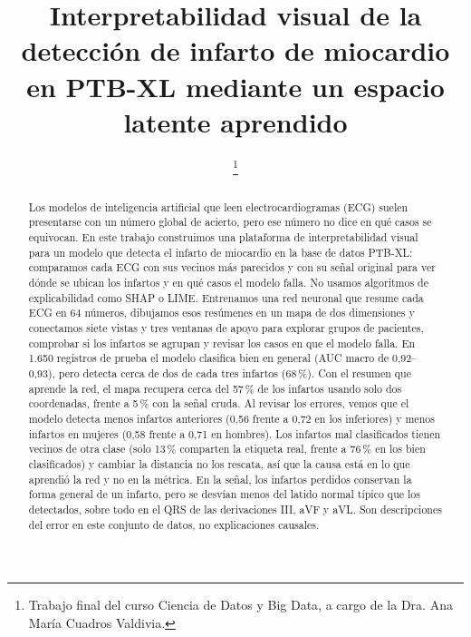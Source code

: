 \documentclass[conference]{IEEEtran}
\begin{document}
\title{Interpretabilidad visual de la detección de infarto de miocardio en PTB-XL mediante un espacio latente aprendido}

\author{
\and
{}
%
\thanks{Trabajo final del curso Ciencia de Datos y Big Data, a cargo de la Dra. Ana María Cuadros Valdivia.}}

\maketitle

\begin{abstract}
Los modelos de inteligencia artificial que leen electrocardiogramas (ECG) suelen presentarse con un número global de acierto, pero ese número no dice en qué casos se equivocan. En este trabajo construimos una plataforma de interpretabilidad visual para un modelo que detecta el infarto de miocardio en la base de datos PTB-XL: comparamos cada ECG con sus vecinos más parecidos y con su señal original para ver dónde se ubican los infartos y en qué casos el modelo falla. No usamos algoritmos de explicabilidad como SHAP o LIME. Entrenamos una red neuronal que resume cada ECG en 64 números, dibujamos esos resúmenes en un mapa de dos dimensiones y conectamos siete vistas y tres ventanas de apoyo para explorar grupos de pacientes, comprobar si los infartos se agrupan y revisar los casos en que el modelo falla. En 1.650 registros de prueba el modelo clasifica bien en general (AUC macro de 0,92--0,93), pero detecta cerca de dos de cada tres infartos (68\,\%). Con el resumen que aprende la red, el mapa recupera cerca del 57\,\% de los infartos usando solo dos coordenadas, frente a 5\,\% con la señal cruda. Al revisar los errores, vemos que el modelo detecta menos infartos anteriores (0,56 frente a 0,72 en los inferiores) y menos infartos en mujeres (0,58 frente a 0,71 en hombres). Los infartos mal clasificados tienen vecinos de otra clase (solo 13\,\% comparten la etiqueta real, frente a 76\,\% en los bien clasificados) y cambiar la distancia no los rescata, así que la causa está en lo que aprendió la red y no en la métrica. En la señal, los infartos perdidos conservan la forma general de un infarto, pero se desvían menos del latido normal típico que los detectados, sobre todo en el QRS de las derivaciones III, aVF y aVL. Son descripciones del error en este conjunto de datos, no explicaciones causales.
\end{abstract}
\end{document}
